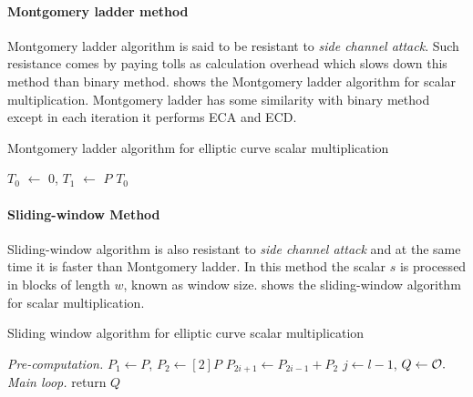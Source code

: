 \paragraph{Montgomery ladder method}
\label{sec:chap:fund:montscm}
Montgomery ladder algorithm is said to be resistant to \textit{side channel attack}. Such resistance comes by paying tolls as calculation overhead which slows down this method than binary method.   shows the Montgomery ladder algorithm for scalar multiplication. Montgomery ladder has some similarity with binary method except in each iteration it performs ECA and ECD. 

\begin{algorithm}[ht]
	\caption{Montgomery ladder algorithm for elliptic curve scalar multiplication}
	\label{alg:mont_scm_chap_fundamental}
	\DontPrintSemicolon
	 $T_0$ $ \leftarrow$ $0$, $T_1$ $\leftarrow$ $P$ \;
	  {\;
		        {
		}
	}
	  $T_0$\;
\end{algorithm}

\paragraph{Sliding-window Method}
\label{sec:chap:fund:swscm}
Sliding-window \cite{DBLP:reference/crc/2005ehcc} algorithm is also resistant to \textit{side channel attack} and at the same  time it is faster than Montgomery ladder. In this method the scalar $s$ is processed in blocks of length $w$, known as window size.  shows the sliding-window algorithm for scalar multiplication.

\begin{algorithm}[ht]
	\caption{Sliding window algorithm for elliptic curve scalar multiplication}
	\label{alg:sw_scm_chap_fundamental}
	\DontPrintSemicolon
	\textit{Pre-computation.} \; 
	 $P_1\leftarrow P$, $P_2 \leftarrow [2]P$ \;
	  { $P_{2i+1} \leftarrow P_{2i-1} + P_2$}\;
	 $j \leftarrow l-1$, $Q \leftarrow \cal{O}.$\;
	\textit{Main loop.}\;
	  {\;
	}
	 return $Q$
\end{algorithm}



